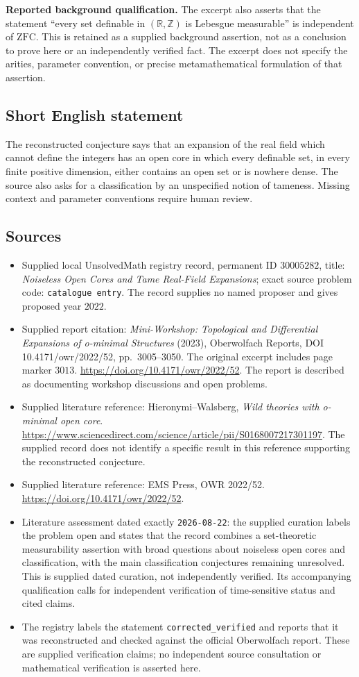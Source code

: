 \documentclass[11pt]{article}
\newcommand{\Z}{\mathbb{Z}}
\newcommand{\R}{\mathbb{R}}
\begin{document}
\textbf{Reported background qualification.} The excerpt also asserts that the statement ``every set definable in \((\R,\Z)\) is Lebesgue measurable'' is independent of \(\mathrm{ZFC}\). This is retained as a supplied background assertion, not as a conclusion to prove here or an independently verified fact. The excerpt does not specify the arities, parameter convention, or precise metamathematical formulation of that assertion.
\subsection{Short English statement}
The reconstructed conjecture says that an expansion of the real field which cannot define the integers has an open core in which every definable set, in every finite positive dimension, either contains an open set or is nowhere dense. The source also asks for a classification by an unspecified notion of tameness. Missing context and parameter conventions require human review.
\subsection{Sources}
\begin{itemize}
\item Supplied local UnsolvedMath registry record, permanent ID \(30005282\), title: \emph{Noiseless Open Cores and Tame Real-Field Expansions}; exact source problem code: \texttt{catalogue entry}. The record supplies no named proposer and gives proposed year \(2022\).
\item Supplied report citation: \emph{Mini-Workshop: Topological and Differential Expansions of o-minimal Structures} (2023), Oberwolfach Reports, DOI 10.4171/owr/2022/52, pp.~3005--3050. The original excerpt includes page marker \(3013\). \url{https://doi.org/10.4171/owr/2022/52}. The report is described as documenting workshop discussions and open problems.
\item Supplied literature reference: Hieronymi--Walsberg, \emph{Wild theories with o-minimal open core}. \url{https://www.sciencedirect.com/science/article/pii/S0168007217301197}. The supplied record does not identify a specific result in this reference supporting the reconstructed conjecture.
\item Supplied literature reference: EMS Press, OWR 2022/52. \url{https://doi.org/10.4171/owr/2022/52}.
\item Literature assessment dated exactly \texttt{2026-08-22}: the supplied curation labels the problem open and states that the record combines a set-theoretic measurability assertion with broad questions about noiseless open cores and classification, with the main classification conjectures remaining unresolved. This is supplied dated curation, not independently verified. Its accompanying qualification calls for independent verification of time-sensitive status and cited claims.
\item The registry labels the statement \texttt{corrected\_verified} and reports that it was reconstructed and checked against the official Oberwolfach report. These are supplied verification claims; no independent source consultation or mathematical verification is asserted here.
\end{itemize}
\end{document}
